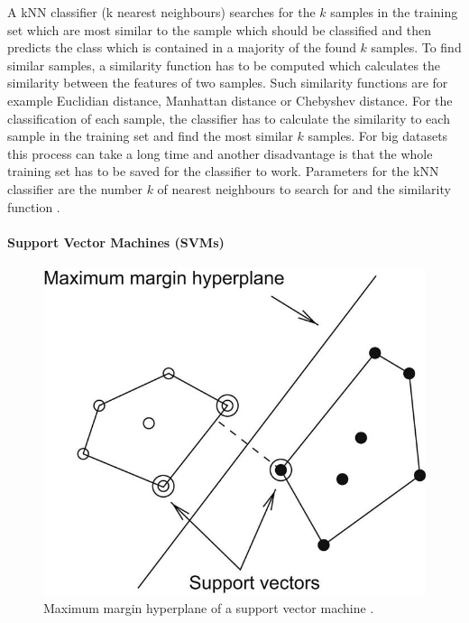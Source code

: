 A kNN classifier (k nearest neighbours) searches for the $k$ samples in the training set which are most similar to the sample which should be classified and then predicts the class which is contained in a majority of the found $k$ samples. To find similar samples, a similarity function has to be computed which calculates the similarity between the features of two samples. Such similarity functions are for example Euclidian distance, Manhattan distance or Chebyshev distance. For the classification of each sample, the classifier has to calculate the similarity to each sample in the training set and find the most similar $k$ samples. For big datasets this process can take a long time and another disadvantage is that the whole training set has to be saved for the classifier to work. Parameters for the kNN classifier are the number $k$ of nearest neighbours to search for and the similarity function \cite{Hall2016_DataMining_ML}.



\paragraph{Support Vector Machines (SVMs)}

\begin{figure}
	\centering
	\includegraphics{img/max_hyperplane_weka_book.jpg}

	\caption{Maximum margin hyperplane of a support vector machine \cite{Hall2016_DataMining_ML}. }
	\label{fig:max_hyperplane}
\end{figure}

